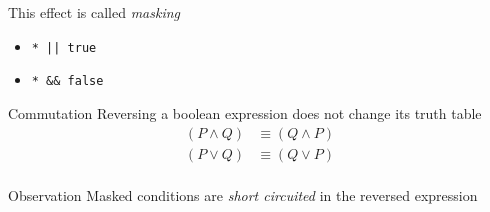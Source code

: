 \documentclass[xcolor = {dvipsnames, table}]{beamer}
\begin{document}
\begin{frame}
    This effect is called \emph{masking}

    \begin{itemize}
        \item \lstinline{* || true}
        \item \lstinline{* && false}
    \end{itemize}
\end{frame}

\begin{frame}
    \begin{block}{Commutation}
        Reversing a boolean expression does not change its truth table
        \begin{align*}
            (P \wedge Q) & \equiv (Q \wedge P) \\
            (P \vee Q)   & \equiv (Q \vee P)   \\
        \end{align*}
    \end{block}

    \begin{block}{Observation}
        Masked conditions are \emph{short circuited} in the reversed expression
    \end{block}
\end{frame}
\end{document}
